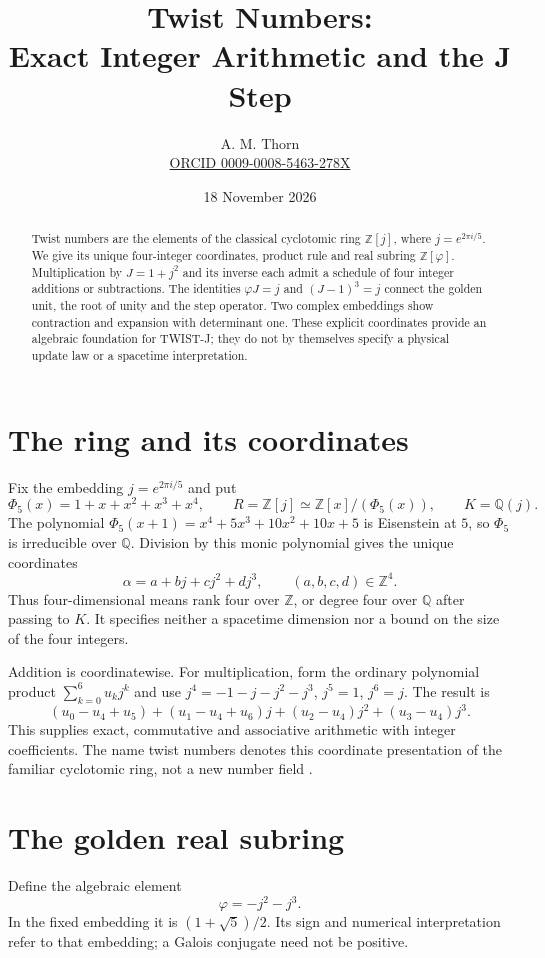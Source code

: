 \documentclass[11pt,a4paper]{article}
\title{Twist Numbers:\\Exact Integer Arithmetic and the J Step}
\author{A. M. Thorn\\\small\href{https://orcid.org/0009-0008-5463-278X}{ORCID 0009-0008-5463-278X}}
\date{18 November 2026}
\newcommand{\Z}{\mathbb Z}
\newcommand{\Q}{\mathbb Q}
\newcommand{\ph}{\varphi}
\begin{document}
\maketitle
\begin{abstract}
Twist numbers are the elements of the classical cyclotomic ring
$\Z[j]$, where $j=e^{2\pi i/5}$. We give its unique four-integer
coordinates, product rule and real subring $\Z[\ph]$.
Multiplication by $J=1+j^2$ and its inverse each admit a schedule of
four integer additions or subtractions. The identities $\ph J=j$
and $(J-1)^3=j$ connect the golden unit, the root of unity and the
step operator. Two complex embeddings show contraction and expansion
with determinant one. These explicit coordinates provide an algebraic
foundation for TWIST-J; they do not by themselves specify a physical
update law or a spacetime interpretation.
\end{abstract}

\section{The ring and its coordinates}\label{sec:coordinates}
Fix the embedding $j=e^{2\pi i/5}$ and put
\[
 \Phi_5(x)=1+x+x^2+x^3+x^4,\qquad
 R=\Z[j]\simeq\Z[x]/(\Phi_5(x)),\qquad K=\Q(j).
\]
The polynomial $\Phi_5(x+1)=x^4+5x^3+10x^2+10x+5$ is Eisenstein
at $5$, so $\Phi_5$ is irreducible over $\Q$. Division by this monic
polynomial gives the unique coordinates
\begin{equation}\label{eq:coordinates}
 \alpha=a+bj+cj^2+dj^3,\qquad (a,b,c,d)\in\Z^4.
\end{equation}
Thus four-dimensional means rank four over $\Z$, or degree four over
$\Q$ after passing to $K$. It specifies neither a spacetime dimension
nor a bound on the size of the four integers.

Addition is coordinatewise. For multiplication, form the ordinary
polynomial product $\sum_{k=0}^6u_kj^k$ and use
$j^4=-1-j-j^2-j^3$, $j^5=1$, $j^6=j$. The result is
\begin{equation}\label{eq:product}
 (u_0-u_4+u_5)+(u_1-u_4+u_6)j+(u_2-u_4)j^2+(u_3-u_4)j^3.
\end{equation}
This supplies exact, commutative and associative arithmetic with integer
coefficients. The name twist numbers denotes this coordinate presentation
of the familiar cyclotomic ring, not a new number field \cite{washington}.

\section{The golden real subring}\label{sec:real}
Define the algebraic element
\begin{equation}\label{eq:golden}
 \ph=-j^2-j^3.
\end{equation}
In the fixed embedding it is $(1+\sqrt5)/2$. Its sign and numerical
interpretation refer to that embedding; a Galois conjugate need not be
positive.
\end{document}
